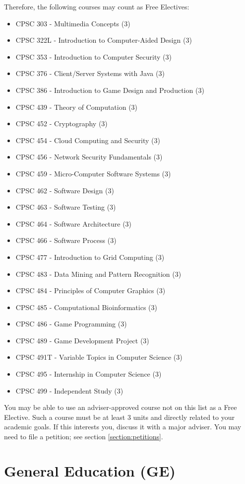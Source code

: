 \documentclass{book}
\begin{document}
Therefore, the following courses may count as Free Electives:
\begin{itemize}
\item CPSC 303 - Multimedia Concepts (3)
\item CPSC 322L - Introduction to Computer-Aided Design (3)
\item CPSC 353 - Introduction to Computer Security (3)
\item CPSC 376 - Client/Server Systems with Java (3)
\item CPSC 386 - Introduction to Game Design and Production (3)
\item CPSC 439 - Theory of Computation (3)
\item CPSC 452 - Cryptography (3)
\item CPSC 454 - Cloud Computing and Security (3)
\item CPSC 456 - Network Security Fundamentals (3)
\item CPSC 459 - Micro-Computer Software Systems (3)
\item CPSC 462 - Software Design (3)
\item CPSC 463 - Software Testing (3)
\item CPSC 464 - Software Architecture (3)
\item CPSC 466 - Software Process (3)
\item CPSC 477 - Introduction to Grid Computing (3)
\item CPSC 483 - Data Mining and Pattern Recognition (3)
\item CPSC 484 - Principles of Computer Graphics (3)
\item CPSC 485 - Computational Bioinformatics (3)
\item CPSC 486 - Game Programming (3)
\item CPSC 489 - Game Development Project (3)
\item CPSC 491T - Variable Topics in Computer Science (3)
\item CPSC 495 - Internship in Computer Science (3)
\item CPSC 499 - Independent Study (3)
\end{itemize}

You may be able to use an adviser-approved course not on this list as a Free Elective. Such a course must be at least 3 units and directly related to your academic goals. If this interests you, discuss it with a major adviser. You may need to file a petition; see section \ref{section:petitions}.

\section{General Education (GE)}
\end{document}
